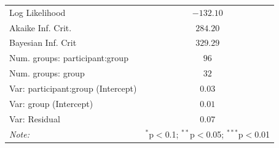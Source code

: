 \begin{appendices}
\begin{table}
\begin{center}
\begin{tabular}{l c }
Log Likelihood                             & $-132.10$       \\
Akaike Inf. Crit.                          & $284.20$        \\
Bayesian Inf. Crit                         & $329.29$        \\
\hline
Num. groups: participant:group     & $96$            \\
Num. groups: group              & $32$            \\
\hline
Var: participant:group (Intercept) & $0.03$          \\
Var: group (Intercept)           & $0.01$          \\
Var: Residual                              & $0.07$          \\
\hline
\textit{Note:}  &\multicolumn{1}{r}{$^{*}$p$<$0.1; $^{**}$p$<$0.05; $^{***}$p$<$0.01} \\
\end{tabular}
\end{center}
\end{table}
    

\end{appendices}
